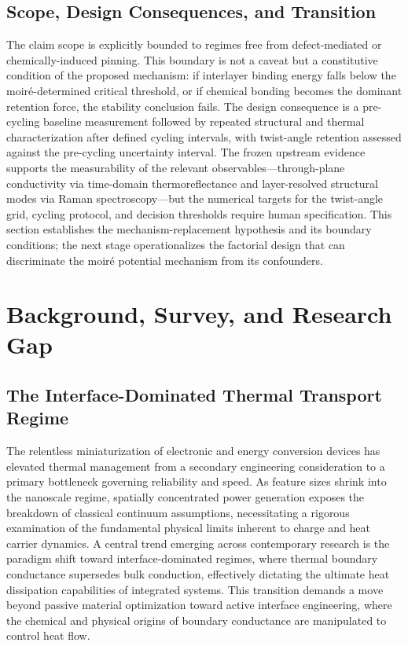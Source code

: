 \documentclass[conference]{IEEEtran}
\begin{document}
\subsection{Scope, Design Consequences, and Transition}
The claim scope is explicitly bounded to regimes free from defect-mediated or chemically-induced pinning. This boundary is not a caveat but a constitutive condition of the proposed mechanism: if interlayer binding energy falls below the moiré-determined critical threshold, or if chemical bonding becomes the dominant retention force, the stability conclusion fails. The design consequence is a pre-cycling baseline measurement followed by repeated structural and thermal characterization after defined cycling intervals, with twist-angle retention assessed against the pre-cycling uncertainty interval. The frozen upstream evidence supports the measurability of the relevant observables—through-plane conductivity via time-domain thermoreflectance and layer-resolved structural modes via Raman spectroscopy—but the numerical targets for the twist-angle grid, cycling protocol, and decision thresholds require human specification. This section establishes the mechanism-replacement hypothesis and its boundary conditions; the next stage operationalizes the factorial design that can discriminate the moiré potential mechanism from its confounders.~\cite{cite_26ecaf73d88dfe33,cite_c8ce7e25ee0b4157}

\section{Background, Survey, and Research Gap}
\subsection{The Interface-Dominated Thermal Transport Regime}
The relentless miniaturization of electronic and energy conversion devices has elevated thermal management from a secondary engineering consideration to a primary bottleneck governing reliability and speed. As feature sizes shrink into the nanoscale regime, spatially concentrated power generation exposes the breakdown of classical continuum assumptions, necessitating a rigorous examination of the fundamental physical limits inherent to charge and heat carrier dynamics. A central trend emerging across contemporary research is the paradigm shift toward interface-dominated regimes, where thermal boundary conductance supersedes bulk conduction, effectively dictating the ultimate heat dissipation capabilities of integrated systems. This transition demands a move beyond passive material optimization toward active interface engineering, where the chemical and physical origins of boundary conductance are manipulated to control heat flow.~\cite{cite_c8ce7e25ee0b4157}
\end{document}
